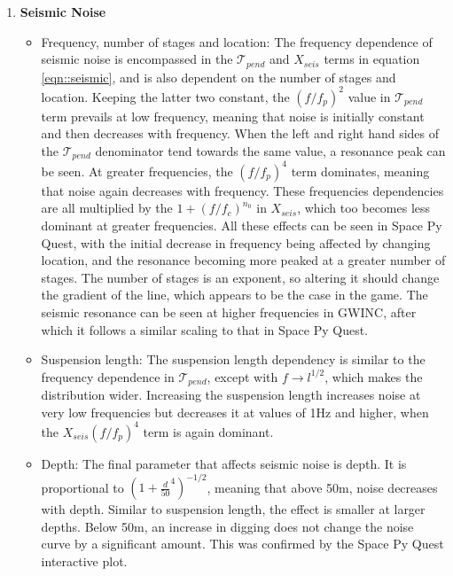 \documentclass{article}
\begin{document}
\begin{enumerate}
    \item \textbf{Seismic Noise}
    \begin{itemize}
    \item Frequency, number of stages and location: The frequency
      dependence of seismic noise is encompassed in the
      $\mathcal{T}_{pend}$ and $X_{seis}$ terms in equation
      \ref{eqn::seismic}, and is also dependent on the number of
      stages and location. Keeping the latter two constant, the
      $(f/f_p)^2$ value in $\mathcal{T}_{pend}$ term prevails at low
      frequency, meaning that noise is initially constant and then
      decreases with frequency. When the left and right hand sides of
      the $\mathcal{T}_{pend}$ denominator tend towards the same
      value, a resonance peak can be seen. At greater frequencies, the
      $(f/f_p)^4$ term dominates, meaning that noise again decreases
      with frequency. These frequencies dependencies are all
      multiplied by the $1+(f/f_c)^{n_0}$ in $X_{seis}$, which too
      becomes less dominant at greater frequencies. All these effects
      can be seen in Space Py Quest, with the initial decrease in
      frequency being affected by changing location, and the resonance
      becoming more peaked at a greater number of stages. The number
      of stages is an exponent, so altering it should change the
      gradient of the line, which appears to be the case in the
      game. The seismic resonance can be seen at higher frequencies in
      GWINC, after which it follows a similar scaling to that in
      Space Py Quest. 
    \item Suspension length: The suspension length dependency is
      similar to the frequency dependence in $\mathcal{T}_{pend}$,
      except with $f\rightarrow l^{1/2}$, which makes the distribution
      wider. Increasing the suspension length increases noise at very
      low frequencies but decreases it at values of 1Hz and higher,
      when the $X_{seis}(f/f_p)^4$ term is again dominant. 
    \item Depth: The final parameter that affects seismic noise is
      depth. It is proportional to $(1+\frac{d}{50}^4)^{-1/2}$,
      meaning that above 50m, noise decreases with depth. Similar to
      suspension length, the effect is smaller at larger depths. Below
      50m, an increase in digging does not change the noise curve by a
      significant amount. This was confirmed by the Space Py Quest
      interactive plot.
    \end{itemize}
    

\end{enumerate}
\end{document}
